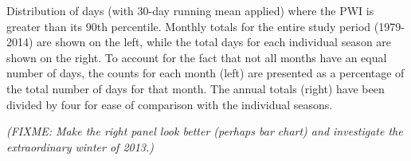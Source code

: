 \label{fig:annual_distribution}
Distribution of days (with 30-day running mean applied) where the PWI is greater than its 90th percentile. Monthly totals for the entire study period (1979-2014) are shown on the left, while the total days for each individual season are shown on the right. To account for the fact that not all months have an equal number of days, the counts for each month (left) are presented as a percentage of the total number of days for that month. The annual totals (right) have been divided by four for ease of comparison with the individual seasons.   

\textit{(FIXME: Make the right panel look better (perhaps bar chart) and investigate the extraordinary winter of 2013.)}

